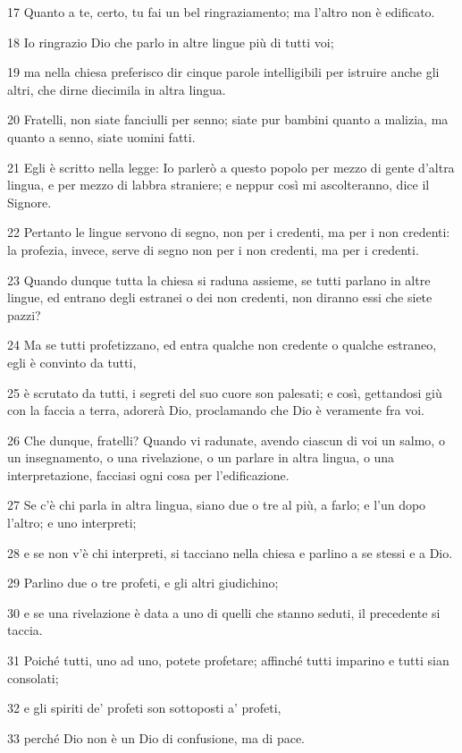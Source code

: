 \par 17 Quanto a te, certo, tu fai un bel ringraziamento; ma l'altro non è edificato.
\par 18 Io ringrazio Dio che parlo in altre lingue più di tutti voi;
\par 19 ma nella chiesa preferisco dir cinque parole intelligibili per istruire anche gli altri, che dirne diecimila in altra lingua.
\par 20 Fratelli, non siate fanciulli per senno; siate pur bambini quanto a malizia, ma quanto a senno, siate uomini fatti.
\par 21 Egli è scritto nella legge: Io parlerò a questo popolo per mezzo di gente d'altra lingua, e per mezzo di labbra straniere; e neppur così mi ascolteranno, dice il Signore.
\par 22 Pertanto le lingue servono di segno, non per i credenti, ma per i non credenti: la profezia, invece, serve di segno non per i non credenti, ma per i credenti.
\par 23 Quando dunque tutta la chiesa si raduna assieme, se tutti parlano in altre lingue, ed entrano degli estranei o dei non credenti, non diranno essi che siete pazzi?
\par 24 Ma se tutti profetizzano, ed entra qualche non credente o qualche estraneo, egli è convinto da tutti,
\par 25 è scrutato da tutti, i segreti del suo cuore son palesati; e così, gettandosi giù con la faccia a terra, adorerà Dio, proclamando che Dio è veramente fra voi.
\par 26 Che dunque, fratelli? Quando vi radunate, avendo ciascun di voi un salmo, o un insegnamento, o una rivelazione, o un parlare in altra lingua, o una interpretazione, facciasi ogni cosa per l'edificazione.
\par 27 Se c'è chi parla in altra lingua, siano due o tre al più, a farlo; e l'un dopo l'altro; e uno interpreti;
\par 28 e se non v'è chi interpreti, si tacciano nella chiesa e parlino a se stessi e a Dio.
\par 29 Parlino due o tre profeti, e gli altri giudichino;
\par 30 e se una rivelazione è data a uno di quelli che stanno seduti, il precedente si taccia.
\par 31 Poiché tutti, uno ad uno, potete profetare; affinché tutti imparino e tutti sian consolati;
\par 32 e gli spiriti de' profeti son sottoposti a' profeti,
\par 33 perché Dio non è un Dio di confusione, ma di pace.
